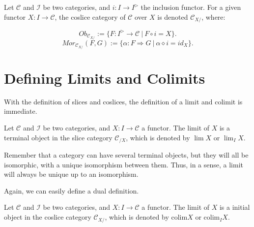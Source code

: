 \begin{definition}
	Let $\mathcal C$ and $\mathcal I$ be two categories, and $i:I \to I^{\rhd}$ the
	inclusion functor. For a given functor $X:I \to \mathcal C$, the coslice category
	of $\mathcal C$ over $X$ is denoted $\mathcal C_{X/}$, where:

	\begin{displaymath}
		Ob_{\mathcal C_{X/}}:=\{
		F: I^\rhd \to \mathcal C \ | \ F \circ i = X
		\}.
	\end{displaymath}
	\begin{displaymath}
		Mor_{\mathcal C_{X/}}(F,G):=\{
		\alpha: F \Rightarrow G \ | \ \alpha \diamond i = id_{X}
		\}.
	\end{displaymath}
\end{definition}

\section{Defining Limits and Colimits}

With the definition of slices and coslices, the definition of a limit and
colimit is immediate.
\begin{definition}[Limit]
	Let $\mathcal C$ and $\mathcal I$ be two categories, and $X:I \to \mathcal C$
	a functor. The limit of $X$ is a terminal object in the slice category
	$\mathcal C_{/X}$, which is denoted by $\lim X$ or $\lim_I X$.
\end{definition}

Remember that a category can have several terminal objects, but they will all
be isomorphic, with a unique isomorphism between them. Thus, in a sense, a limit
will always be unique up to an isomorphism.

Again, we can easily define a dual definition.

\begin{definition}[Colimit]
	Let $\mathcal C$ and $\mathcal I$ be two categories, and $X:I \to \mathcal C$
	a functor. The limit of $X$ is a initial object in the coslice category
	$\mathcal C_{X/}$, which is denoted by $\text{colim} X$ or $\text{colim}_I X$.
\end{definition}
